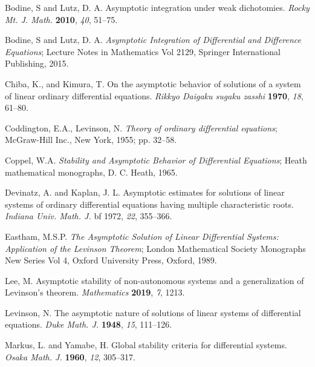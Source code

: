 \documentclass[a4paper,11pt]{article}
\newcounter{Theorem}
\theoremstyle{remark}
\begin{document}
\begin{thebibliography}{999}


Bodine, S and Lutz, D. A. Asymptotic integration under weak dichotomies. {\em Rocky Mt. J. Math.} {\bf 2010}, {\em 40}, 51--75.



Bodine, S and Lutz, D. A. {\em Asymptotic Integration of Differential and Difference Equations}; Lecture Notes in Mathematics Vol 2129, Springer International Publishing, 2015.

Chiba, K., and Kimura, T. On the asymptotic behavior of solutions of a system of linear ordinary differential equations. {\em Rikkyo Daigaku sugaku zasshi} {\bf 1970}, {\em 18}, 61--80.

Coddington, E.A., Levinson, N. {\em Theory of ordinary differential equations}; McGraw-Hill Inc., New York, 1955; pp. 32--58.

Coppel, W.A. {\em Stability and Asymptotic Behavior of Differential Equations}; Heath mathematical monographs, D. C. Heath, 1965.


Devinatz, A. and Kaplan, J. L. Asymptotic estimates for solutions of linear systems of ordinary differential equations having multiple characteristic roots. {\em Indiana Univ. Math. J.} {bf 1972}, {\em 22}, 355--366.

Eastham, M.S.P. {\em The Asymptotic Solution of Linear Differential Systems: Application of the Levinson Theorem}; London Mathematical Society Monographs New Series Vol 4, Oxford University Press, Oxford, 1989.

Lee, M. Asymptotic stability of non-autonomous systems and a generalization of Levinson's theorem. {\em Mathematics} {\bf 2019}, {\em 7}, 1213.

Levinson, N. The asymptotic nature of solutions of linear systems of differential equations. {\em Duke Math. J.} {\bf 1948}, {\em 15}, 111--126.

Markus, L. and Yamabe, H. Global stability criteria for differential systems. {\em Osaka Math. J.} {\bf 1960}, {\em 12}, 305--317.


\end{thebibliography}
\end{document}
